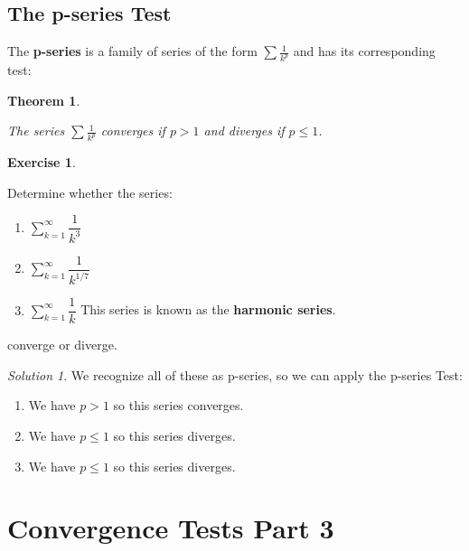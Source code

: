 \documentclass[
]{book}
\providecommand{\tightlist}{%
  \setlength{\itemsep}{0pt}\setlength{\parskip}{0pt}}
\newtheorem{theorem}{Theorem}[chapter]
\theoremstyle{definition}
\theoremstyle{definition}
\theoremstyle{definition}
\newtheorem{exercise}{Exercise}[chapter]
\theoremstyle{definition}
\theoremstyle{remark}
\newtheorem*{solution}{Solution}
\begin{document}
\hypertarget{the-p-series-test}{%
\section{The p-series Test}\label{the-p-series-test}}

The \textbf{p-series} is a family of series of the form \(\displaystyle \sum \frac{1}{k^p}\) and has its corresponding test:

\begin{theorem}
\protect\hypertarget{thm:unlabeled-div-194}{}\label{thm:unlabeled-div-194}

The series \(\displaystyle \sum \frac{1}{k^p}\) converges if \(p>1\) and diverges if \(p\leq 1\).

\end{theorem}

\begin{exercise}
\protect\hypertarget{exr:unlabeled-div-195}{}\label{exr:unlabeled-div-195}

Determine whether the series:

\begin{enumerate}
\def\labelenumi{\alph{enumi}.}
\tightlist
\item
  \(\displaystyle \sum_{k=1}^\infty \dfrac{1}{k^3}\)
\item
  \(\displaystyle \sum_{k=1}^\infty \dfrac{1}{{k}^{1/7}}\)
\item
  \(\displaystyle \sum_{k=1}^\infty \dfrac{1}{k}\) This series is known as the \textbf{harmonic series}.
\end{enumerate}

converge or diverge.

\end{exercise}

\begin{solution}

We recognize all of these as p-series, so we can apply the p-series Test:

\begin{enumerate}
\def\labelenumi{\alph{enumi}.}
\tightlist
\item
  We have \(p>1\) so this series converges.
\item
  We have \(p\leq 1\) so this series diverges.
\item
  We have \(p\leq 1\) so this series diverges.
\end{enumerate}

\end{solution}

\hypertarget{lec-28}{%
\chapter{Convergence Tests Part 3}\label{lec-28}}
\end{document}
